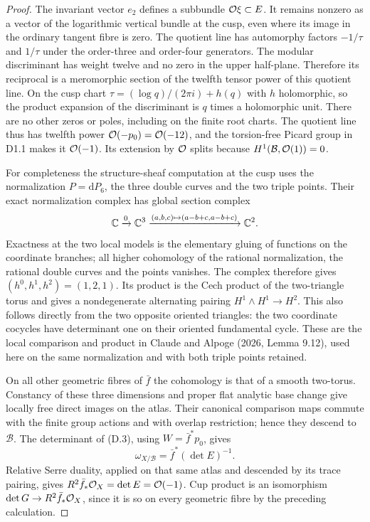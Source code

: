 \begin{proof}
The invariant vector $e_2$ defines a subbundle $\mathcal O\xi\subset E$.
It remains nonzero as a vector of the logarithmic vertical bundle at
the cusp, even where its image in the ordinary tangent fibre is zero.
The quotient line has automorphy factors $-1/\tau$ and $1/\tau$ under
the order-three and order-four generators. The modular discriminant
has weight twelve and no zero in the upper half-plane. Therefore its
reciprocal is a meromorphic section of the twelfth tensor power of
this quotient line. On the cusp chart
$\tau=(\log q)/(2\pi i)+h(q)$ with $h$ holomorphic, so the product
expansion of the discriminant is $q$ times a holomorphic unit.
There are no other zeros or poles, including on the finite root
charts. The quotient line thus has twelfth power
$\mathcal O(-p_0)=\mathcal O(-12)$, and the torsion-free Picard group in D1.1 makes
it $\mathcal O(-1)$. Its extension by $\mathcal O$ splits because
$H^1(\mathcal B,\mathcal O(1))=0$.

For completeness the structure-sheaf computation at the cusp uses the
normalization $P=\mathrm dP_6$, the three double curves and the two
triple points. Their exact normalization complex has global section
complex
\[
 \mathbb C\xrightarrow{0}\mathbb C^3
 \xrightarrow{(a,b,c)\mapsto(a-b+c,a-b+c)}\mathbb C^2.
\]
Exactness at the two local models is the elementary gluing of functions
on the coordinate branches; all higher cohomology of the rational
normalization, the rational double curves and the points vanishes.
The complex therefore gives $(h^0,h^1,h^2)=(1,2,1)$. Its product is
the Cech product of the two-triangle torus and gives a nondegenerate
alternating pairing $H^1\wedge H^1\to H^2$. This also follows directly
from the two opposite oriented triangles: the two coordinate cocycles
have determinant one on their oriented fundamental cycle. These are
the local comparison and product in Claude and Alpoge (2026,
Lemma 9.12), used here on the same normalization and with both triple
points retained.

On all other geometric fibres of $\bar f$ the cohomology is that of a
smooth two-torus. Constancy of these three dimensions and proper flat
analytic base change give locally free direct images on the atlas.
Their canonical comparison maps commute with the finite group actions
and with overlap restriction; hence they descend to $\mathcal B$.
The determinant of (D.3), using $W=\bar f^*p_0$, gives
\[
 \omega_{X/\mathcal B}=\bar f^*(\det E)^{-1}.
\]
Relative Serre duality, applied on that same atlas and descended by
its trace pairing, gives $R^2\bar f_*\mathcal O_X=\det E=\mathcal O(-1)$.
Cup product is an isomorphism $\det G\to R^2\bar f_*\mathcal O_X$, since it
is so on every geometric fibre by the preceding calculation.


\end{proof}
